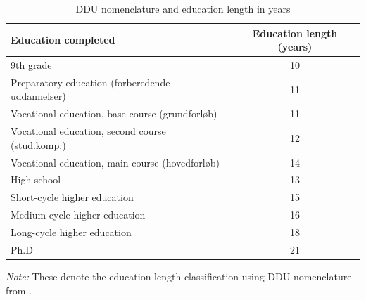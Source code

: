\documentclass[../main.tex]{subfiles}
\begin{document}
\begin{table}[H]
    \caption{DDU nomenclature and education length in years}
    \label{tab:dst_disced15_educ_length_classification}
        \centering
\begin{threeparttable}
    \begin{tabular}{lc}
    \toprule
    Education completed & Education length (years) \\
    \midrule
         9th grade & 10 \\
         Preparatory education (forberedende uddannelser) & 11 \\
         Vocational education, base course (grundforløb) & 11 \\
         Vocational education, second course (stud.komp.)  & 12 \\
         Vocational education, main course (hovedforløb)  & 14 \\
         High school & 13 \\
         Short-cycle higher education & 15 \\
         Medium-cycle higher education & 16 \\
         Long-cycle higher education & 18 \\
         Ph.D & 21 \\
    \midrule
    \end{tabular}
    \label{tab:my_label}
\begin{tablenotes}[flushleft]
\item \scriptsize \textit{Note:} These denote the education length classification using DDU nomenclature from \textcite{dst_ddu_edu}.
\end{tablenotes}
\end{threeparttable}
\end{table}
\end{document}
